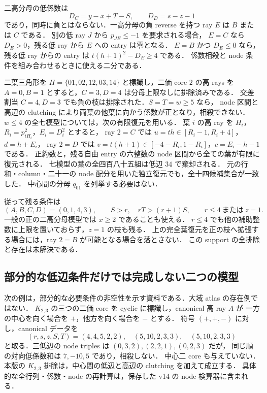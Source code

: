 二高分母の低係数は
\[
 D_C=y-x+T-S,\qquad D_D=s-z-1
\]
であり，同時に負とはならない．一高分母の負 reverse を持つ ray $E$ は $B$ または $C$ である．
別の低 ray $J$ から $p_{JE}\leq-1$ を要求される場合，
$E=C$ なら $D_E>0$，残る低 ray から $E$ への entry は零となる．
$E=B$ かつ $D_E\leq0$ なら，残る低 ray からの entry は
$t(h+1)^2-D_E\geq4$ である．
係数相殺と node 条件を組み合わせるときに使える二分である．

二葉三角形を $H=\{01,02,12,03,14\}$ と標識し，二価 core $2$ の高 rays を
$A=0,B=1$ とすると，$C=3,D=4$ は分母上限なしに排除済みである．
交差割当 $C=4,D=3$ でも負の枝は排除された．$S=T=w\ge5$ なら，
node 区間と高辺の clutching により両葉の他葉に向かう係数が正となり，相殺できない．
$w\le4$ の全七模型については，次の有限復元を用いる．
葉 $i$ の高 ray を $H_i$，$R_i=p^2_{iH_i}$，$E_i=D^2_i$ とすると，
ray $2=C$ では $u=th\in[R_i-1,R_i+4]$，$d=h+E_i$，
ray $2=D$ では $v=t(h+1)\in[-4-R_i,1-R_i]$，$c=E_i-h-1$ である．
正約数と，残る自由 entry の六整数の node 区間から全ての葉が有限に復元される．
七模型の葉の全四百八十五組は低辺 $34$ で棄却される．
元の行和・column・二十一の node 配分を用いた独立復元でも，全十四候補集合が一致した．
中心間の分母 $q_{01}$ を列挙する必要はない．

従って残る条件は
\[
 (A,B,C,D)=(0,1,4,3),\qquad S>r,\quad rT>(r+1)S,
 \qquad r\le4\ \text{または}\ z=1.
\]
一般の正の二高分母模型では $x\ge2$ であることも使える．
$r\le4$ でも他の補助整数に上限を置いておらず，$z=1$ の枝も残る．
上の完全葉復元を正の枝へ拡張する場合には，ray $2=B$ が可能となる場合を落とさない．
この support の全排除と存在は未解決である．

\subsection{部分的な低辺条件だけでは完成しない二つの模型}
\label{ng15:partial-patches}

次の例は，部分的な必要条件の非空性を示す資料である．大域 atlas の存在例ではない．
$K_{2,3}$ の三つの二価 core を cyclic に標識し，canonical 高 ray $A$ が
一方の中心を向く場合を $+$，他方を向く場合を $-$ とする．
符号 $(+,+,-)$ に対し，canonical データを
\[
 (r,s,z,S,T)=(4,4,5,2,2),\quad(5,10,2,3,3),\quad(5,10,2,3,3)
\]
と取る．三低辺の node triples は $(0,3,2),(2,2,1),(0,2,3)$ だが，
同じ順の対向低係数和は $7,-10,5$ であり，相殺しない．
中心二 core も与えていない．本版の $K_{2,3}$ 排除は，中心間の低辺と高辺の clutching を加えて成立する．
具体的な全行列・係数・node の再計算は，保存した v14 の node 検算器に含まれる．

